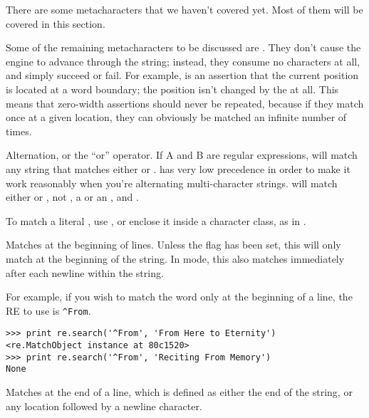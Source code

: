\documentclass{howto}
\begin{document}
There are some metacharacters that we haven't covered yet.  Most of
them will be covered in this section.

Some of the remaining metacharacters to be discussed are
.  They don't cause the engine to advance
through the string; instead, they consume no characters at all,
and simply succeed or fail.  For example,  is an
assertion that the current position is located at a word boundary; the
position isn't changed by the  at all.  This means that
zero-width assertions should never be repeated, because if they match
once at a given location, they can obviously be matched an infinite
number of times.

\begin{list}{}{}

\item[\regexp{|}] 
Alternation, or the ``or'' operator.  
If A and B are regular expressions, 
 will match any string that matches either  or .
\regexp{|} has very low precedence in order to make it work reasonably when
you're alternating multi-character strings.
 will match either  or , not
, a  or an , and .

To match a literal \character{|},
use \regexp{\e|}, or enclose it inside a character class, as in \regexp{[|]}.

\item[\regexp{\^}] Matches at the beginning of lines.  Unless the
 flag has been set, this will only match at the
beginning of the string.  In  mode, this also
matches immediately after each newline within the string.  

For example, if you wish to match the word  only at the
beginning of a line, the RE to use is \verb|^From|.

\begin{verbatim}
>>> print re.search('^From', 'From Here to Eternity')
<re.MatchObject instance at 80c1520>
>>> print re.search('^From', 'Reciting From Memory')
None
\end{verbatim}


\item[\regexp{\$}] Matches at the end of a line, which is defined as
either the end of the string, or any location followed by a newline
character.    


\end{list}
\end{document}
